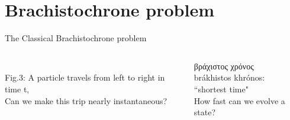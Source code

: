 \documentclass[10pt]{beamer}
\begin{document}
\section{Brachistochrone problem}
\begin{frame}{The Classical Brachistochrone problem}
\vspace{0.5cm}
\begin{columns}
    \hspace{1.5em}
    \begin{column}{\textwidth}
    \\
    \hspace{1em}
    \tiny{Fig.3:
    A particle travels from left to right in time t,\\
    \hspace{2.4em}
    Can we make this trip nearly instantaneous?}
    \end{column}
    
    \hspace{-15em}
    \begin{column}{0.5\textwidth}
        βράχιστος χρόνος\\
        brákhistos khrónos:\\
        ``shortest time"\\
    \vspace{1cm}
    \small{\textcolor{myNewColorC}{How fast can we evolve a state?}
    }
    \end{column}
    \end{columns}
\end{frame}
\end{document}
